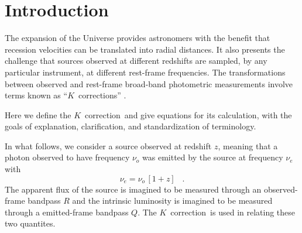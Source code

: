 \documentclass[preprint]{aastex}
\newcommand{\kcorrection}{$K$~correction}
\newcommand{\kcorrections}{{\kcorrection}s}
\newcommand{\nuobs}{\nu_o}
\newcommand{\nuemit}{\nu_e}
\begin{document}
\title{\scalebox{1.5}{The \kcorrection}}
\author{
  David W. Hogg,
  Ivan K. Baldry,
  Michael Blanton,
  and
  Daniel J. Eisenstein
  \\ \textsl{sixth draft---2002 October 7}
}

\begin{abstract}
The \kcorrection\ ``corrects'' for the fact that sources observed at
different redshifts are, in general, observed at different rest-frame
wavelengths.  It is part of the relation between the emitted- or
rest-frame absolute magnitude of a source in one broad photometric
bandpass to the observed-frame apparent magnitude of the same source
in another broad bandpass.  This short pedagogical paper provides
definitions of and equations for the \kcorrection.
\end{abstract}

\section{Introduction}

The expansion of the Universe provides astronomers with the benefit
that recession velocities can be translated into radial distances.  It
also presents the challenge that sources observed at different
redshifts are sampled, by any particular instrument, at different
rest-frame frequencies.  The transformations between observed and
rest-frame broad-band photometric measurements involve terms known as
``\kcorrections'' \citep*{humason56a, oke68a}.

Here we define the \kcorrection\ and give equations for its
calculation, with the goals of explanation, clarification, and
standardization of terminology.

In what follows, we consider a source observed at redshift $z$,
meaning that a photon observed to have frequency $\nuobs$ was emitted
by the source at frequency $\nuemit$ with
\begin{equation}
\nuemit = \nuobs\,[1+z] \;\;\;.
\end{equation}
The apparent flux of the source is imagined to be measured through an
observed-frame bandpass $R$ and the intrinsic luminosity is imagined
to be measured through a emitted-frame bandpass $Q$.  The
\kcorrection\ is used in relating these two quantites.
\end{document}
